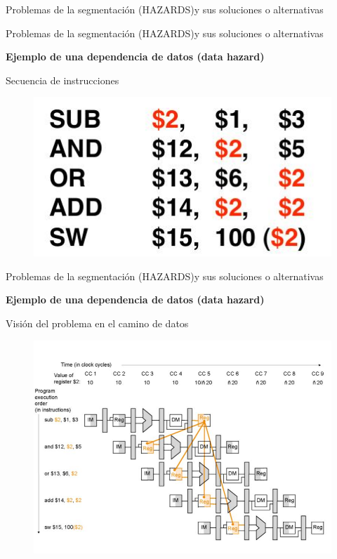 \documentclass[aspectratio=169,compress]{beamer}
\begin{document}
\begin{footnotesize}
\begin{frame}{Problemas de la segmentación (HAZARDS)}{y sus soluciones o alternativas}
\end{frame}



\begin{frame}{Problemas de la segmentación (HAZARDS)}{y sus soluciones o alternativas}
\begin{center}\textbf{Ejemplo de una dependencia de datos (data hazard)}\end{center}
Secuencia de instrucciones
\begin{figure}
\includegraphics[scale=0.35]{images/pipeling-hazard1.jpg} 
\end{figure}

\end{frame}


\begin{frame}{Problemas de la segmentación (HAZARDS)}{y sus soluciones o alternativas}
\begin{center}\textbf{Ejemplo de una dependencia de datos (data hazard)}\end{center}
Visión del problema en el camino de datos
\begin{figure}
\includegraphics[scale=0.35]{images/pipeling-hazard2.jpg} 
\end{figure}


\end{frame}
\end{footnotesize}
\end{document}
